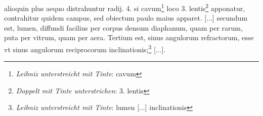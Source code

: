 \pend \pstart [p.~154] [...] alioquin plus aequo distrahuntur radij\protect{}. 4. si cavum\footnote{\textit{Leibniz unterstreicht mit Tinte}: cavum} loco 3. lentis\protect{}\footnote{\textit{Doppelt mit Tinte unterstrichen}: 3. lentis} apponatur, contrahitur quidem campus, sed obiectum paulo maius apparet. [...] secundum est, lumen, diffundi facilius per corpus densum diaphanum, quam per rarum, puta per vitrum, quam per aera. Tertium est, sinus angulorum refractorum\protect{}, esse vt sinus angulorum reciprocorum inclinationis;\footnote{\textit{Leibniz unterstreicht mit Tinte}: lumen [...] inclinationis} [...].